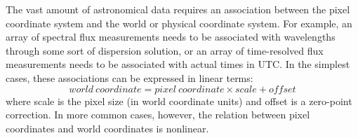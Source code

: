 

The vast amount of astronomical data requires an association between
the pixel coordinate system and the world or physical coordinate
system.  For example, an array of spectral flux measurements needs to
be associated with wavelengths through some sort of dispersion
solution, or an array of time-resolved flux measurements needs to be
associated with actual times in UTC.  In the simplest cases, these
associations can be expressed in linear terms: $$ world\ coordinate =
pixel\ coordinate \times scale + offset$$ where scale is the pixel
size (in world coordinate units) and offset is a zero-point
correction.  In more common cases, however, the relation between pixel
coordinates and world coordinates is nonlinear.

\bigskip




\bye
